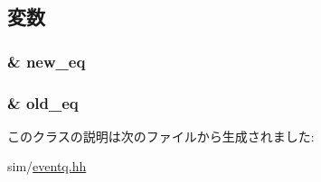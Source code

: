 \subsection{変数}
\hypertarget{classEventQueue_1_1ScopedMigration_acffe9fa404c2dfbf6b44e3878126d16e}{
\subsubsection[{new\_\-eq}]{\& {\bf new\_\-eq}}}
\label{classEventQueue_1_1ScopedMigration_acffe9fa404c2dfbf6b44e3878126d16e}
\hypertarget{classEventQueue_1_1ScopedMigration_a02c314e5863bbb391a274dbf23923154}{
\subsubsection[{old\_\-eq}]{\& {\bf old\_\-eq}}}
\label{classEventQueue_1_1ScopedMigration_a02c314e5863bbb391a274dbf23923154}


このクラスの説明は次のファイルから生成されました:\begin{DoxyCompactItemize}
\item 
sim/\hyperlink{eventq_8hh}{eventq.hh}\end{DoxyCompactItemize}
